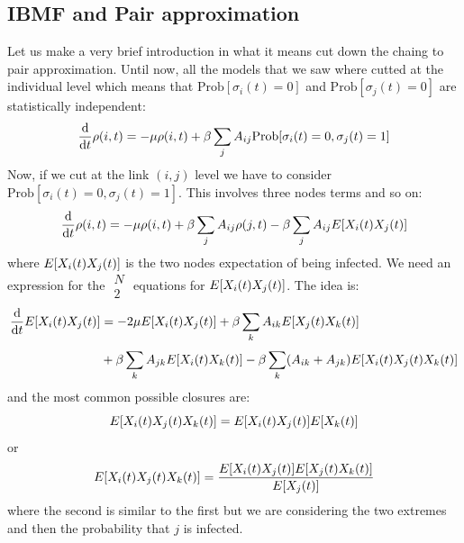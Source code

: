 \documentclass[../main/main.tex]{subfiles}
\begin{document}
\subsection{IBMF and Pair approximation}

Let us make a very brief introduction in what it means cut down the chaing to pair approximation.
Until now, all the models that we saw where cutted at the individual level which means that \( \text{Prob} [\sigma _i (t)=0] \) and \( \text{Prob} [\sigma _j (t) = 0] \) are statistically independent:
\begin{equation*}
  \dv{}{t} \rho (i,t) = - \mu \rho (i,t) + \beta \sum_{j}^{} A_{ij} \text{Prob} [\sigma _i(t)=0, \sigma _j(t)=1]
\end{equation*}
Now, if we cut at the link \( (i,j) \) level we have to consider \( \text{Prob} [\sigma _i(t)=0, \sigma _j(t)=1]  \). This involves three nodes terms and so on:
\begin{equation*}
  \dv{}{t} \rho (i,t) = - \mu \rho (i,t) + \beta \sum_{j}^{} A_{ij} \rho (j,t) - \beta \sum_{j}^{} A_{ij} E \qty[X_i (t) X_j (t)]
\end{equation*}
where \(  E \qty[X_i (t) X_j (t)] \) is the two nodes expectation of being infected.
We need an expression for the \( \substack{N \\ 2}  \) equations for \(  E \qty[X_i (t) X_j (t)] \).
The idea is:
\begin{equation}
\begin{split}
  \dv{}{t} E \qty[X_i (t) X_j (t)] &=  - 2 \mu E \qty[X_i (t) X_j (t)] + \beta \sum_{k}^{} A_{ik} E \qty[X_j (t) X_k (t)]  \\
  & + \beta \sum_{k}^{} A_{jk} E \qty[X_i (t) X_k (t)]  - \beta
  \sum_{k}^{} (A_{ik}+A_{jk}) E \qty[X_i (t) X_j (t) X_k (t)]
\end{split}
\end{equation}
and the most common possible closures are:
\begin{equation*}
  E \qty[X_i (t) X_j (t) X_k (t)]   = E \qty[X_i (t) X_j (t)] E[X_k (t)]
\end{equation*}
or
\begin{equation*}
  E \qty[X_i (t) X_j (t) X_k (t)]   = \frac{E \qty[X_i (t) X_j (t)] E[X_j (t) X_k (t)]  }{E[X_j (t)]}
\end{equation*}
where the second is similar to the first but we are considering the two extremes and then the probability that \( j \) is infected.
\end{document}
